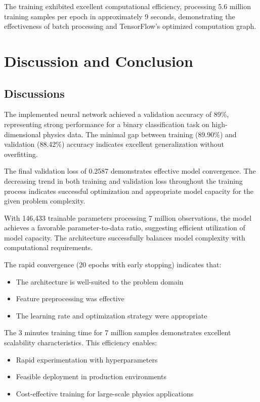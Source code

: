 \documentclass[12pt,a4paper]{article}
\begin{document}
The training exhibited excellent computational efficiency, processing 5.6 million training samples per epoch in approximately 9 seconds, demonstrating the effectiveness of batch processing and TensorFlow's optimized computation graph.

\section{Discussion and Conclusion}

\subsection{Discussions}

The implemented neural network achieved a validation accuracy of 89\%, representing strong performance for a binary classification task on high-dimensional physics data. The minimal gap between training (89.90\%) and validation (88.42\%) accuracy indicates excellent generalization without overfitting.

The final validation loss of 0.2587 demonstrates effective model convergence. The decreasing trend in both training and validation loss throughout the training process indicates successful optimization and appropriate model capacity for the given problem complexity.

With 146,433 trainable parameters processing 7 million observations, the model achieves a favorable parameter-to-data ratio, suggesting efficient utilization of model capacity. The architecture successfully balances model complexity with computational requirements.

The rapid convergence (20 epochs with early stopping) indicates that:

\begin{itemize}
    \item The architecture is well-suited to the problem domain
    \item Feature preprocessing was effective
    \item The learning rate and optimization strategy were appropriate
\end{itemize}

The 3 minutes training time for 7 million samples demonstrates excellent scalability characteristics. This efficiency enables:
\begin{itemize}
    \item Rapid experimentation with hyperparameters
    \item Feasible deployment in production environments
    \item Cost-effective training for large-scale physics applications
\end{itemize}
\end{document}
